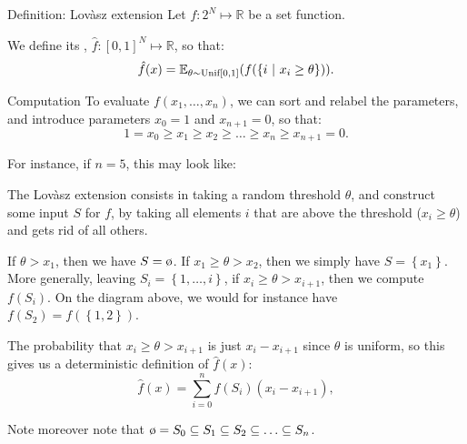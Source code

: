 \documentclass[a4paper]{article}
\begin{document}
\begin{parag}{Definition: Lovàsz extension}
    Let $f: 2^N \mapsto \mathbb{R}$ be a set function.

    We define its , $\hat{f}: \left[0, 1\right]^N \mapsto \mathbb{R}$, so that: 
    \[\hat{f}\left(x\right) = \exval_{\theta \followsdistr \text{Unif}\left[0, 1\right]}\left(f\left(\left\{i \suchthat x_i \geq \theta\right\}\right)\right).\]

    \begin{subparag}{Computation}
        To evaluate $f\left(x_1, \ldots, x_n\right)$, we can sort and relabel the parameters, and introduce parameters $x_0 = 1$ and $x_{n+1} = 0$, so that: 
        \[1 = x_0 \geq x_1 \geq x_2 \geq \ldots \geq x_n \geq x_{n+1} = 0.\]

        For instance, if $n = 5$, this may look like:

        The Lovàsz extension consists in taking a random threshold $\theta$, and construct some input $S$ for $f$, by taking all elements $i$ that are above the threshold ($x_i \geq \theta$) and gets rid of all others.

        If $\theta > x_1$, then we have $S = \o$. If $x_1 \geq \theta > x_2$, then we simply have $S = \left\{x_1\right\}$. More generally, leaving $S_i = \left\{1, \ldots, i\right\}$, if $x_i \geq \theta > x_{i+1}$, then we compute $f\left(S_i\right)$. On the diagram above, we would for instance have $f\left(S_2\right) = f\left(\left\{1, 2\right\}\right)$.

        The probability that $x_i \geq \theta > x_{i+1}$ is just $x_i - x_{i+1}$ since $\theta$ is uniform, so this gives us a deterministic definition of $\hat{f}\left(x\right)$:
        \[\hat{f}\left(x\right) = \sum_{i=0}^{n} f\left(S_i\right) \left(x_i - x_{i+1}\right),\]

        Note moreover note that $\o = S_0  \subseteq S_1 \subseteq S_2 \subseteq \ldots \subseteq S_n$.
    \end{subparag}
\end{parag}
\end{document}
